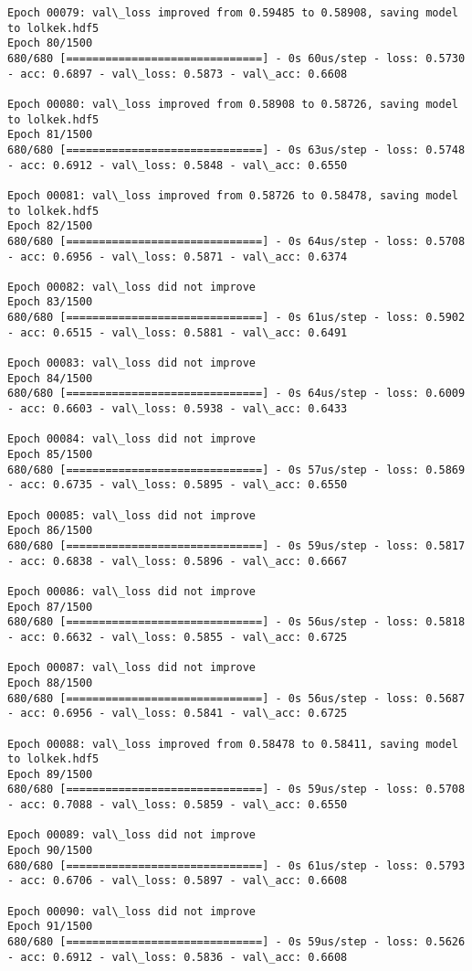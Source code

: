 \documentclass[11pt]{article}
\begin{document}
\begin{Verbatim}[commandchars=\\\{\}]
Epoch 00079: val\_loss improved from 0.59485 to 0.58908, saving model to lolkek.hdf5
Epoch 80/1500
680/680 [==============================] - 0s 60us/step - loss: 0.5730 - acc: 0.6897 - val\_loss: 0.5873 - val\_acc: 0.6608

Epoch 00080: val\_loss improved from 0.58908 to 0.58726, saving model to lolkek.hdf5
Epoch 81/1500
680/680 [==============================] - 0s 63us/step - loss: 0.5748 - acc: 0.6912 - val\_loss: 0.5848 - val\_acc: 0.6550

Epoch 00081: val\_loss improved from 0.58726 to 0.58478, saving model to lolkek.hdf5
Epoch 82/1500
680/680 [==============================] - 0s 64us/step - loss: 0.5708 - acc: 0.6956 - val\_loss: 0.5871 - val\_acc: 0.6374

Epoch 00082: val\_loss did not improve
Epoch 83/1500
680/680 [==============================] - 0s 61us/step - loss: 0.5902 - acc: 0.6515 - val\_loss: 0.5881 - val\_acc: 0.6491

Epoch 00083: val\_loss did not improve
Epoch 84/1500
680/680 [==============================] - 0s 64us/step - loss: 0.6009 - acc: 0.6603 - val\_loss: 0.5938 - val\_acc: 0.6433

Epoch 00084: val\_loss did not improve
Epoch 85/1500
680/680 [==============================] - 0s 57us/step - loss: 0.5869 - acc: 0.6735 - val\_loss: 0.5895 - val\_acc: 0.6550

Epoch 00085: val\_loss did not improve
Epoch 86/1500
680/680 [==============================] - 0s 59us/step - loss: 0.5817 - acc: 0.6838 - val\_loss: 0.5896 - val\_acc: 0.6667

Epoch 00086: val\_loss did not improve
Epoch 87/1500
680/680 [==============================] - 0s 56us/step - loss: 0.5818 - acc: 0.6632 - val\_loss: 0.5855 - val\_acc: 0.6725

Epoch 00087: val\_loss did not improve
Epoch 88/1500
680/680 [==============================] - 0s 56us/step - loss: 0.5687 - acc: 0.6956 - val\_loss: 0.5841 - val\_acc: 0.6725

Epoch 00088: val\_loss improved from 0.58478 to 0.58411, saving model to lolkek.hdf5
Epoch 89/1500
680/680 [==============================] - 0s 59us/step - loss: 0.5708 - acc: 0.7088 - val\_loss: 0.5859 - val\_acc: 0.6550

Epoch 00089: val\_loss did not improve
Epoch 90/1500
680/680 [==============================] - 0s 61us/step - loss: 0.5793 - acc: 0.6706 - val\_loss: 0.5897 - val\_acc: 0.6608

Epoch 00090: val\_loss did not improve
Epoch 91/1500
680/680 [==============================] - 0s 59us/step - loss: 0.5626 - acc: 0.6912 - val\_loss: 0.5836 - val\_acc: 0.6608


\end{Verbatim}
\end{document}
